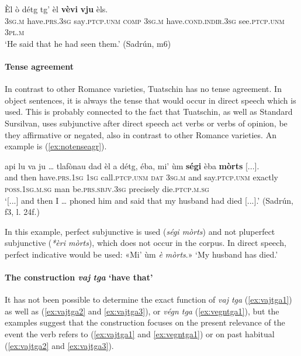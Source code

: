 \ea
\label{ex:cond.indir3}
\gll Èl ò détg tg' èl \textbf{vèvi} \textbf{vju} èls.\\
 \textsc{3sg.m} have.\textsc{prs.3sg} say\textsc{.ptcp.unm} \textsc{comp} \textsc{3sg.m} have.\textsc{cond.indir.3sg} see.\textsc{ptcp.unm} \textsc{3pl.m}\\
 \glt `He said that he had seen them.' (Sadrún, m6)
 \z


\paragraph{Tense agreement}
In contrast to other Romance varieties, Tuatschin has no tense agreement. In object sentences, it is always the tense that would occur in direct speech which is used. This is probably connected to the fact that Tuatschin, as well as Standard Sursilvan, uses subjunctive after direct speech act verbs or verbs of opinion, be they affirmative or negated, also in contrast to other Romance varieties. An example is (\ref{ex:notenseagr}).

\ea
\label{ex:notenseagr}
\gll  [...] api lu va ju … tlafònau dad èl a détg, éba, mi' ùm \textbf{ségi} èba \textbf{mòrts} [...]. \\
{} and then have.\textsc{prs.1sg} \textsc{1sg} {} call.\textsc{ptcp.unm} \textsc{dat} \textsc{3sg.m} and say.\textsc{ptcp.unm} exactly \textsc{poss.1sg.m.sg} man be.\textsc{prs.sbjv.3sg} precisely die.\textsc{ptcp.m.sg} \\ 
\glt `[...] and then I … phoned him and said that my husband had died [...].' (Sadrún, f3, l. 24f.)
\z

In this example, perfect subjunctive is used (\textit{ségi mòrts}) and not pluperfect subjunctive (\textit{*èri mòrts}), which does not occur in the corpus. In direct speech, perfect indicative would be used: «Mi' ùm \textit{è mòrts}.» `My husband has died.'

\paragraph{The construction \textit{vaj} \textit{tga} `have that'}
It has not been possible to determine the exact function of \textit{vaj tga} (\ref{ex:vajtga1}) as well as (\ref{ex:vajtga2} and \ref{ex:vajtga3}), or \textit{végn tga} (\ref{ex:vegntga1}), but the examples suggest that the construction focuses on the present relevance of the event the verb refers to (\ref{ex:vajtga1} and \ref{ex:vegntga1}) or on past habitual (\ref{ex:vajtga2} and \ref{ex:vajtga3}).

